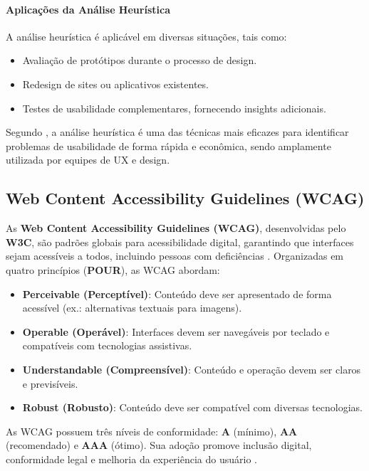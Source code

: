 \paragraph{Aplicações da Análise Heurística}
A análise heurística é aplicável em diversas situações, tais como:

\begin{itemize}
    \item Avaliação de protótipos durante o processo de design.
    \item Redesign de sites ou aplicativos existentes.
    \item Testes de usabilidade complementares, fornecendo insights adicionais.
\end{itemize}

Segundo \cite{Nielsen1994}, a análise heurística é uma das técnicas mais eficazes para identificar problemas de usabilidade de forma rápida e econômica, sendo amplamente utilizada por equipes de UX e design.

\subsection{Web Content Accessibility Guidelines (WCAG)}

As \textbf{Web Content Accessibility Guidelines (WCAG)}, desenvolvidas pelo \textbf{W3C}, são padrões globais para acessibilidade digital, garantindo que interfaces sejam acessíveis a todos, incluindo pessoas com deficiências \citep{wcag21}. Organizadas em quatro princípios (\textbf{POUR}), as WCAG abordam:

\begin{itemize}
    \item \textbf{Perceivable (Perceptível)}: Conteúdo deve ser apresentado de forma acessível (ex.: alternativas textuais para imagens).
    \item \textbf{Operable (Operável)}: Interfaces devem ser navegáveis por teclado e compatíveis com tecnologias assistivas.
    \item \textbf{Understandable (Compreensível)}: Conteúdo e operação devem ser claros e previsíveis.
    \item \textbf{Robust (Robusto)}: Conteúdo deve ser compatível com diversas tecnologias.
\end{itemize}

As WCAG possuem três níveis de conformidade: \textbf{A} (mínimo), \textbf{AA} (recomendado) e \textbf{AAA} (ótimo). Sua adoção promove inclusão digital, conformidade legal e melhoria da experiência do usuário \citep{wcag21}.

